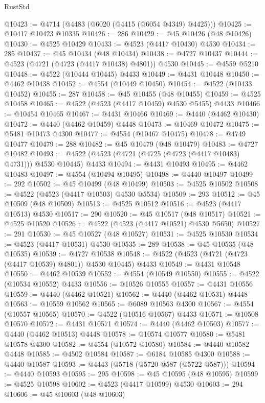 \begin{lexlean}{RustStd}
\begin{coremodule}
@10423 := @4714 (@4483 (@6020 (@4415 (@6054 @4349) @4425)))
@10425 := @10417 @10423 @10335
@10426 := 286
@10429 := @45 @10426 (@48 @10426)
@10430 := @4525 @10429
@10433 := @4523 (@4417 @10430) @4530
@10434 := 285
@10437 := @45 @10434 (@48 @10434)
@10438 := @4727 @10437
@10444 := @4523 (@4721 (@4723 (@4417 @10438) @4801)) @4530
@10445 := @4559 @5210
@10448 := @4522 (@10444 @10445) @4433
@10449 := @4431 @10448
@10450 := @4462 @10438
@10452 := @4554 (@10449 @10450)
@10454 := @4522 (@10433 @10452)
@10455 := 287
@10458 := @45 @10455 (@48 @10455)
@10459 := @4525 @10458
@10465 := @4522 (@4523 (@4417 @10459) @4530 @5455) @4433
@10466 := @10454 @10465
@10467 := @4431 @10466
@10469 := @4440 (@4462 @10430)
@10472 := @4440 (@4462 @10459) @4448
@10473 := @10469 @10472
@10475 := @5481 @10473 @4300
@10477 := @4554 (@10467 @10475)
@10478 := @4749 @10477
@10479 := 288
@10482 := @45 @10479 (@48 @10479)
@10483 := @4727 @10482
@10493 := @4522 (@4523 (@4721 (@4725 (@4723 (@4417 @10483) @4731))) @4530 @10445) @4433
@10494 := @4431 @10493
@10495 := @4462 @10483
@10497 := @4554 (@10494 @10495)
@10498 := @4440 @10497
@10499 := 292
@10502 := @45 @10499 (@48 @10499)
@10503 := @4525 @10502
@10508 := @4522 (@4523 (@4417 @10503) @4530 @5534)
@10509 := 293
@10512 := @45 @10509 (@48 @10509)
@10513 := @4525 @10512
@10516 := @4523 (@4417 @10513) @4530
@10517 := 290
@10520 := @45 @10517 (@48 @10517)
@10521 := @4525 @10520
@10526 := @4522 (@4523 (@4417 @10521) @4530 @5650)
@10527 := 291
@10530 := @45 @10527 (@48 @10527)
@10531 := @4525 @10530
@10534 := @4523 (@4417 @10531) @4530
@10535 := 289
@10538 := @45 @10535 (@48 @10535)
@10539 := @4727 @10538
@10548 := @4522 (@4523 (@4721 (@4723 (@4417 @10539) @4801)) @4530 @10445) @4433
@10549 := @4431 @10548
@10550 := @4462 @10539
@10552 := @4554 (@10549 @10550)
@10555 := @4522 (@10534 @10552) @4433
@10556 := @10526 @10555
@10557 := @4431 @10556
@10559 := @4440 (@4462 @10521)
@10562 := @4440 (@4462 @10531) @4448
@10563 := @10559 @10562
@10565 := @6089 @10563 @4300
@10567 := @4554 (@10557 @10565)
@10570 := @4522 (@10516 @10567) @4433
@10571 := @10508 @10570
@10572 := @4431 @10571
@10574 := @4440 (@4462 @10503)
@10577 := @4440 (@4462 @10513) @4448
@10578 := @10574 @10577
@10580 := @5481 @10578 @4300
@10582 := @4554 (@10572 @10580)
@10584 := @4440 @10582 @4448
@10585 := @4502 @10584
@10587 := @6184 @10585 @4300
@10588 := @4440 @10587
@10593 := @4443 (@5718 (@5720 @587 (@5722 @587)))
@10594 := @4440 @10593
@10595 := 295
@10598 := @45 @10595 (@48 @10595)
@10599 := @4525 @10598
@10602 := @4523 (@4417 @10599) @4530
@10603 := 294
@10606 := @45 @10603 (@48 @10603)

\end{coremodule}
\end{lexlean}
